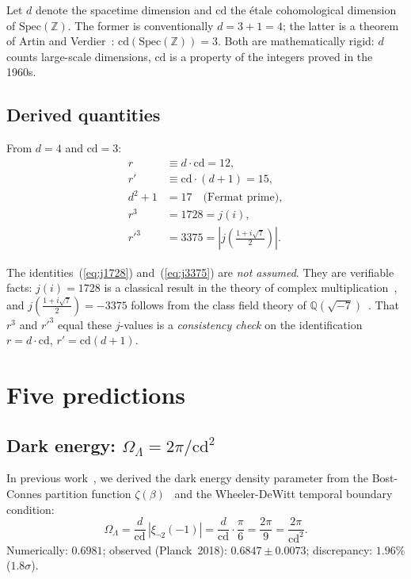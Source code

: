 \documentclass[aps,prl,twocolumn,superscriptaddress,nofootinbib]{revtex4-2}
\newcommand{\Spec}{\mathrm{Spec}}
\newcommand{\cd}{\mathrm{cd}}
\newcommand{\Z}{\mathbb{Z}}
\newcommand{\Q}{\mathbb{Q}}
\begin{document}
Let $d$ denote the spacetime dimension and $\cd$ the \'etale
cohomological dimension of $\Spec(\Z)$.
The former is conventionally $d = 3 + 1 = 4$;
the latter is a theorem of Artin and Verdier~\cite{ArtinVerdier}:
$\cd(\Spec(\Z)) = 3$.
Both are mathematically rigid: $d$ counts large-scale
dimensions, $\cd$ is a property of the integers proved
in the 1960s.

\subsection{Derived quantities}

From $d = 4$ and $\cd = 3$:
\begin{align}
  r   &\equiv d \cdot \cd = 12, \label{eq:r}\\
  r'  &\equiv \cd \cdot (d+1) = 15, \label{eq:rprime}\\
  d^2 + 1 &= 17 \quad\text{(Fermat prime)}, \label{eq:fermat}\\
  r^3 &= 1728 = j(i), \label{eq:j1728}\\
  {r'}^3 &= 3375 = |j(\tfrac{1+i\sqrt{7}}{2})|. \label{eq:j3375}
\end{align}

The identities~(\ref{eq:j1728}) and~(\ref{eq:j3375}) are
\emph{not assumed}. They are verifiable facts: $j(i) = 1728$
is a classical result in the theory of complex
multiplication~\cite{Silverman2009}, and
$j(\tfrac{1+i\sqrt{7}}{2}) = -3375$ follows from the class
field theory of $\Q(\sqrt{-7})$~\cite{Cox2013}.
That $r^3$ and ${r'}^3$ equal these $j$-values is a
\emph{consistency check} on the identification
$r = d \cdot \cd$, $r' = \cd(d+1)$.

\section{Five predictions}

\subsection{Dark energy: $\Omega_\Lambda = 2\pi/\cd^2$}

In previous work~\cite{WB_dark_energy}, we derived the dark energy
density parameter from the Bost-Connes partition function
$\zeta(\beta)$~\cite{BostConnes1995} and the
Wheeler-DeWitt temporal boundary condition:
\begin{equation}
  \Omega_\Lambda = \frac{d}{\cd}\,|\xi_{\neg 2}(-1)|
  = \frac{d}{\cd} \cdot \frac{\pi}{6}
  = \frac{2\pi}{9} = \frac{2\pi}{\cd^2}.
  \label{eq:omega}
\end{equation}
Numerically: $0.6981$; observed (Planck~2018): $0.6847 \pm 0.0073$;
discrepancy: $1.96\%$ ($1.8\sigma$).
\end{document}
